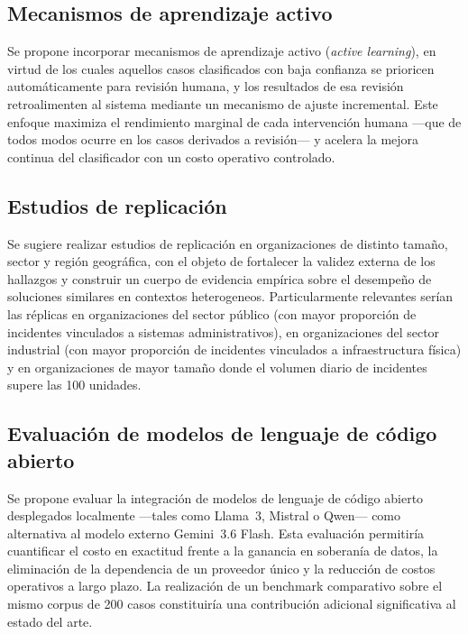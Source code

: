 \subsection{Mecanismos de aprendizaje activo}\label{subsec:aprendizaje-activo}

Se propone incorporar mecanismos de aprendizaje activo (\emph{active learning}), en virtud de los cuales aquellos casos clasificados con baja confianza se prioricen automáticamente para revisión humana, y los resultados de esa revisión retroalimenten al sistema mediante un mecanismo de ajuste incremental. Este enfoque maximiza el rendimiento marginal de cada intervención humana ---que de todos modos ocurre en los casos derivados a revisión--- y acelera la mejora continua del clasificador con un costo operativo controlado.

\subsection{Estudios de replicación}\label{subsec:estudios-replicacion}

Se sugiere realizar estudios de replicación en organizaciones de distinto tamaño, sector y región geográfica, con el objeto de fortalecer la validez externa de los hallazgos y construir un cuerpo de evidencia empírica sobre el desempeño de soluciones similares en contextos heterogeneos. Particularmente relevantes serían las réplicas en organizaciones del sector público (con mayor proporción de incidentes vinculados a sistemas administrativos), en organizaciones del sector industrial (con mayor proporción de incidentes vinculados a infraestructura física) y en organizaciones de mayor tamaño donde el volumen diario de incidentes supere las 100 unidades.

\subsection{Evaluación de modelos de lenguaje de código abierto}\label{subsec:evaluacion-modelos-abiertos}

Se propone evaluar la integración de modelos de lenguaje de código abierto desplegados localmente ---tales como Llama~3, Mistral o Qwen--- como alternativa al modelo externo Gemini~3.6 Flash. Esta evaluación permitiría cuantificar el costo en exactitud frente a la ganancia en soberanía de datos, la eliminación de la dependencia de un proveedor único y la reducción de costos operativos a largo plazo. La realización de un benchmark comparativo sobre el mismo corpus de 200 casos constituiría una contribución adicional significativa al estado del arte.

